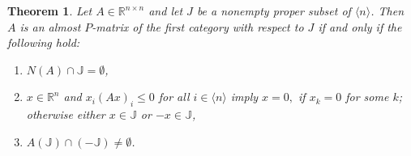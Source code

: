 \documentclass[11pt]{article}
\newtheorem{theorem}{Theorem}[section]
\begin{document}
 \begin{theorem}\label{alm-p-1st}
 Let $A \in \mathbb{R}^{n \times n}$ and let $J$  be a nonempty proper subset of $ \langle n \rangle$. Then $A$ is an almost $P$-matrix of the first category with respect to $J$ if and only if
the following hold:

 \begin{enumerate}
 	\item[(a)] $N(A) \cap  \mathbb{J} = \emptyset$,
 	\item[(b)] $x \in \mathbb{R}^n$ and $x_i (Ax)_i \leq 0$ for all $i \in \langle n \rangle$ imply $x=0,$ if $x_k=0$  for some $k$; otherwise either $x\in \mathbb{J}$ or $-x \in \mathbb{J}$,
 	\item[(c)] $A (\mathbb{J}) \cap  (-\mathbb{J}) \neq \emptyset$.
 \end{enumerate}
 \end{theorem}
\end{document}
